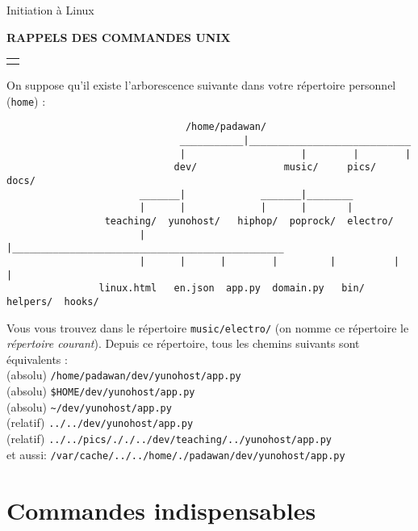 \documentclass [a4paper]{article}
\newcommand{\bc}{\begin{center}}
\newcommand{\ec}{\end{center}}
\begin{document}
\noindent Initiation à Linux
\bc
 \textbf{RAPPELS DES COMMANDES UNIX} \\
\ec


\noindent\begin{tabular}{p{17.2cm}}
 \hline
 \\
\end{tabular}

On suppose qu'il existe l'arborescence suivante dans votre répertoire personnel (\verb+home+) :

\begin{verbatim}
                               /home/padawan/
                              ___________|____________________________
                              |                    |        |        |
                             dev/               music/     pics/    docs/
                       _______|             _______|________
                       |      |             |      |       |
                 teaching/  yunohost/   hiphop/  poprock/  electro/
                       |      |_______________________________________________
                       |      |      |        |         |          |         |
                linux.html   en.json  app.py  domain.py   bin/     helpers/  hooks/
\end{verbatim}

Vous vous trouvez dans le répertoire {\verb+music/electro/+} (on nomme ce répertoire
 le {\it répertoire courant}). Depuis ce répertoire, tous les chemins suivants sont équivalents :\\
(absolu)  \verb+/home/padawan/dev/yunohost/app.py+\\
(absolu)  \verb+$HOME/dev/yunohost/app.py+\\
(absolu)  \verb+~/dev/yunohost/app.py+\\
(relatif) \verb+../../dev/yunohost/app.py+\\
(relatif) \verb+../../pics/././../dev/teaching/../yunohost/app.py+\\
et aussi: \verb+/var/cache/../../home/./padawan/dev/yunohost/app.py+\\


\section*{Commandes indispensables}
\end{document}
